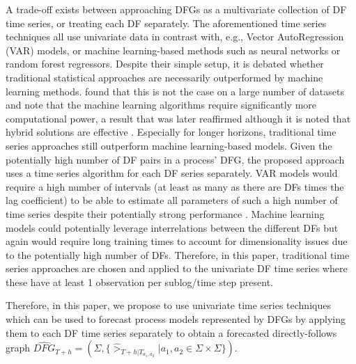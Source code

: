 A trade-off exists between approaching DFGs as a multivariate collection of DF time series, or treating each DF separately.
The aforementioned time series techniques all use univariate data in contrast with, e.g., Vector AutoRegression (VAR) models, or machine learning-based methods such as neural networks or random forest regressors.
Despite their simple setup, it is debated whether traditional statistical approaches are necessarily outperformed by machine learning methods. 
\cite{makridakis2018statistical} found that this is not the case on a large number of datasets and note that the machine learning algorithms require significantly more computational power, a result that was later reaffirmed although it is noted that hybrid solutions are effective \cite{makridakis2020m4}.
Especially for longer horizons, traditional time series approaches still outperform machine learning-based models.
Given the potentially high number of DF pairs in a process' DFG, the proposed approach uses a time series algorithm for each DF series separately.
VAR models would require a high number of intervals (at least as many as there are DFs times the lag coefficient) to be able to estimate all parameters of such a high number of time series despite their potentially strong performance \cite{thomakos2004naive}.
Machine learning models could potentially leverage interrelations between the different DFs but again would require long training times to account for dimensionality issues due to the potentially high number of DFs. Therefore, in this paper, traditional time series approaches are chosen and applied to the univariate DF time series where these have at least 1 observation per sublog/time step present.

Therefore, in this paper, we propose to use univariate time series techniques which can be used to forecast process models represented by DFGs by applying them to each DF time series separately to obtain a forecasted directly-follows graph $\widehat{DFG}_{T+h}=(\Sigma,\{\hat{>}_{T+h|T_{a_1,a_2}}|a_1,a_2\in \Sigma\times\Sigma\})$.


